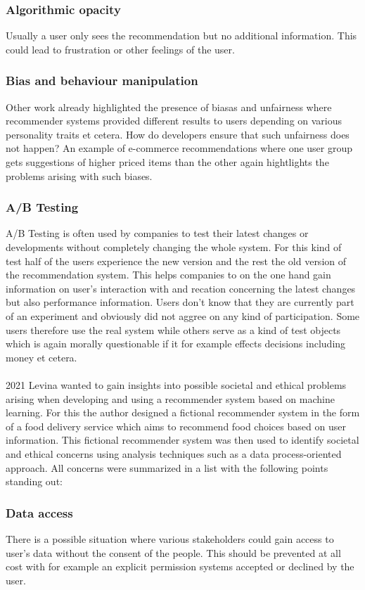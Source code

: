\documentclass[runningheads,a4paper]{llncs}
\begin{document}
\subsubsection{Algorithmic opacity}
Usually a user only sees the recommendation but no additional information. This could lead to frustration or other feelings of the user.
\subsubsection{Bias and behaviour manipulation}  
Other work already highlighted the presence of biasas and unfairness where recommender systems provided different results to users depending on various personality traits et cetera. 
How do developers ensure that such unfairness does not happen? An example of e-commerce recommendations where one user group gets suggestions of higher priced items than the other again hightlights the problems arising with such biases. 
\subsubsection{A/B Testing}
A/B Testing is often used by companies to test their latest changes or developments without completely changing the whole system.
For this kind of test half of the users experience the new version and the rest the old version of the recommendation system.
This helps companies to on the one hand gain information on user's interaction with and recation concerning the latest changes but also performance information.
Users don't know that they are currently part of an experiment and obviously did not aggree on any kind of participation. 
Some users therefore use the real system while others serve as a kind of test objects which is again morally questionable if it for example effects decisions including money et cetera.\cite{paraschakis2016recommender}\\
\\
2021 Levina wanted to gain insights into possible societal and ethical problems arising when developing and using a recommender system based on machine learning.
For this the author designed a fictional recommender system in the form of a food delivery service which aims to recommend 
food choices based on user information. 
This fictional recommender system was then used to identify societal and ethical concerns using analysis techniques such as a data process-oriented approach.
All concerns were summarized in a list with the following points standing out:
\subsubsection{Data access}
There is a possible situation where various stakeholders could gain access to user's data without the consent of the people. This should be prevented at all cost with for example an explicit permission systems accepted or declined by the user.
\end{document}
